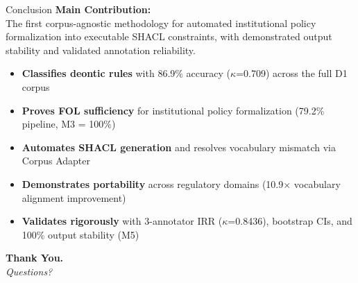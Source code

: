 \documentclass[aspectratio=169, 10pt]{beamer}
\begin{document}
\begin{frame}{Conclusion}
    \textbf{Main Contribution:} \\
    The first corpus-agnostic methodology for automated institutional policy formalization into executable SHACL constraints, with demonstrated output stability and validated annotation reliability.
    
    \vspace{0.3cm}
    \begin{itemize}
        \item \textbf{Classifies deontic rules} with 86.9\% accuracy ($\kappa$=0.709) across the full D1 corpus
        \item \textbf{Proves FOL sufficiency} for institutional policy formalization (79.2\% pipeline, M3 = 100\%)
        \item \textbf{Automates SHACL generation} and resolves vocabulary mismatch via Corpus Adapter
        \item \textbf{Demonstrates portability} across regulatory domains (10.9$\times$ vocabulary alignment improvement)
        \item \textbf{Validates rigorously} with 3-annotator IRR ($\kappa$=0.8436), bootstrap CIs, and 100\% output stability (M5)
    \end{itemize}
    
    \vspace{0.5cm}
    \centering
    \Large \textbf{Thank You.} \\
    \normalsize \textit{Questions?}
\end{frame}


\appendix
\end{document}
